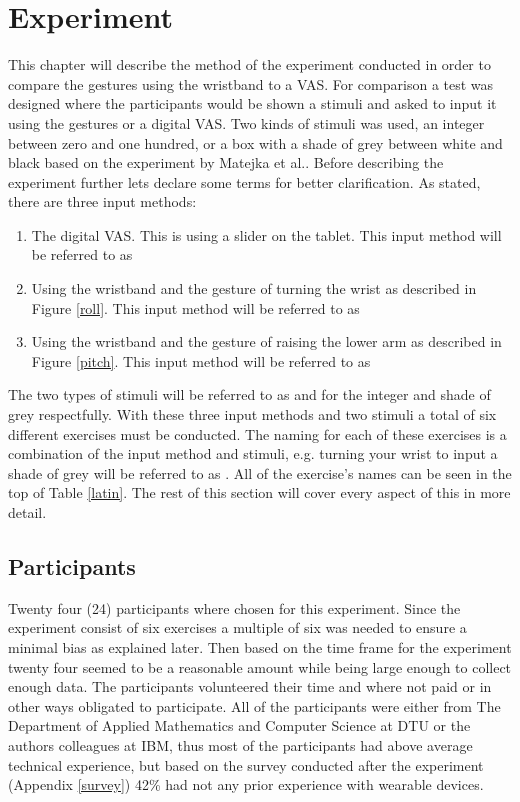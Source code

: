 \chapter{Experiment}

This chapter will describe the method of the experiment conducted in order to compare the gestures using the wristband to a VAS. For comparison a test was designed where the participants would be shown a stimuli and asked to input it using the gestures or a digital VAS. Two kinds of stimuli was used, an integer between zero and one hundred, or a box with a shade of grey between white and black based on the experiment by Matejka et al.\cite{grey}. Before describing the experiment further lets declare some terms for better clarification. As stated, there are three input methods:

\begin{enumerate}
\item The digital VAS. This is using a slider on the tablet. This input method will be referred to as 
\item Using the wristband and the gesture of turning the wrist as described in Figure \ref{roll}. This input method will be referred to as 
\item Using the wristband and the gesture of raising the lower arm as described in Figure \ref{pitch}. This input method will be referred to as 
\end{enumerate}

The two types of stimuli will be referred to as  and  for the integer and shade of grey respectfully. With these three input methods and two stimuli a total of six different exercises must be conducted. The naming for each of these exercises is a combination of the input method and stimuli, e.g. turning your wrist to input a shade of grey will be referred to as . All of the exercise's names can be seen in the top of Table \ref{latin}. The rest of this section will cover every aspect of this in more detail.

\section{Participants}
Twenty four (24) participants where chosen for this experiment. Since the experiment consist of six exercises a multiple of six was needed to ensure a minimal bias as explained later. Then based on the time frame for the experiment twenty four seemed to be a reasonable amount while being large enough to collect enough data. The participants volunteered their time and where not paid or in other ways obligated to participate. All of the participants were either from The Department of Applied Mathematics and Computer Science at DTU or the authors colleagues at IBM, thus most of the participants had above average technical experience, but based on the survey conducted after the experiment (Appendix \ref{survey}) 42\% had not any prior experience with wearable devices.

